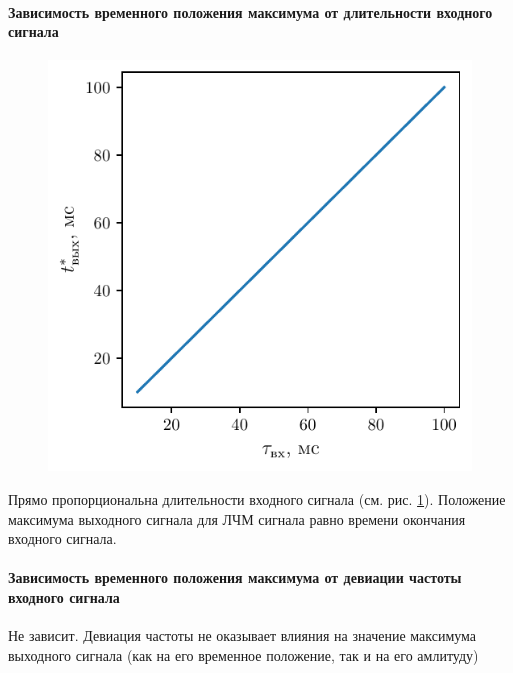 \paragraph{Зависимость временного положения максимума от длительности входного сигнала}%


\begin{figure}[H]
    \centering
    \includegraphics[width=0.6\linewidth]{imgs/task3/t3f2}
    \caption{}
    \label{fig:3.3}
\end{figure}

Прямо пропорциональна длительности входного сигнала (см. рис. \ref{fig:3.3}). Положение максимума
выходного сигнала для ЛЧМ сигнала равно времени окончания входного сигнала.

\paragraph{Зависимость временного положения максимума от девиации частоты входного сигнала}%

Не зависит. Девиация частоты не оказывает влияния на значение максимума выходного сигнала (как на его временное положение, так и на его амлитуду)

